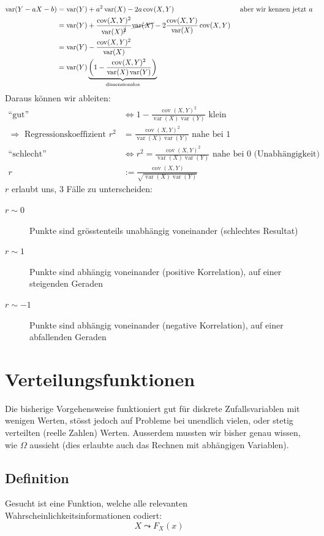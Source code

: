 \documentclass[10pt,a4paper]{scrartcl}
\DeclareMathOperator{\var}{var}
\DeclareMathOperator{\cov}{cov}
\begin{document}
\begin{align*}
\var(Y-aX-b) & = \var(Y) + a^2\var(X) - 2a\cov(X, Y) & \text{ aber wir kennen jetzt } a\\
             & = \var(Y) + \frac{\cov(X, Y)^2}{\var(X)^{\cancel{2}}}\cancel{\var(X)} - 2\frac{\cov(X, Y)}{\var(X)} \cov(X,Y) \\
             & = \var(Y) - \frac{\cov(X, Y)^2}{\var(X)}\\
             & = \var(Y) \underbrace{\left(1 - \frac{\cov(X,Y)^2}{\var(X)\var(Y)}\right)}_{\text{dimensionslos}}
\end{align*}
Daraus können wir ableiten:
\begin{align*}
\text{``gut''} & \Leftrightarrow 1 - \frac{\cov(X,Y)^2}{\var(X)\var(Y)} \text{ klein} \\
               \Rightarrow \text{ Regressionskoeffizient } r^2 & = \frac{\cov(X,Y)^2}{\var(X)\var(Y)} \text{ nahe bei } 1 \\
\text{``schlecht''} & \Leftrightarrow r^2 = \frac{\cov(X,Y)^2}{\var(X)\var(Y)} \text{ nahe bei } 0 \text{ (Unabhängigkeit)} \\
r & := \frac{\cov(X,Y)}{\sqrt{\var(X)\var(Y)}}
\end{align*}
$r$ erlaubt uns, 3 Fälle zu unterscheiden:
\begin{description}
\item[$r\sim 0$] Punkte sind grösstenteils unabhängig voneinander (schlechtes Resultat)
\item[$r\sim 1$] Punkte sind abhängig voneinander (positive Korrelation), auf einer steigenden Geraden
\item[$r\sim -1$] Punkte sind abhängig voneinander (negative Korrelation), auf einer abfallenden Geraden
\end{description}

\section{Verteilungsfunktionen}
Die bisherige Vorgehensweise funktioniert gut für diskrete Zufallsvariablen mit wenigen Werten, stösst jedoch auf Probleme bei unendlich vielen, oder stetig verteilten (reelle Zahlen) Werten. Ausserdem mussten wir bisher genau wissen, wie $\Omega$ aussieht (dies erlaubte auch das Rechnen mit abhängigen Variablen).

\subsection{Definition}
Gesucht ist eine Funktion, welche alle relevanten Wahrscheinlichkeitsinformationen codiert:
$$X \leadsto F_X(x)$$
\end{document}
